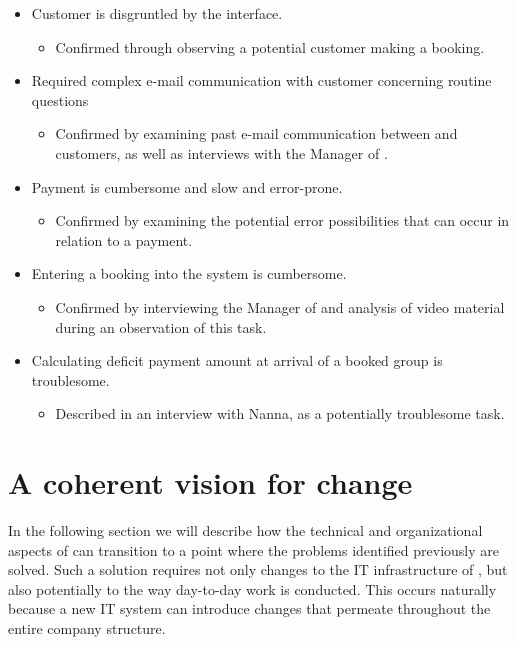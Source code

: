 \begin{itemize}
	\item Customer is disgruntled by the interface.
    \begin{itemize}
        \item Confirmed through observing a potential customer making a booking.
    \end{itemize}
	\item Required complex e-mail communication with customer concerning routine questions
        \begin{itemize}
            \item Confirmed by examining past e-mail communication between
                \gomonkey{} and customers, as well as interviews with the
                Manager of \gomonkey{}.
        \end{itemize}
	\item Payment is cumbersome and slow and error-prone.
        \begin{itemize}
            \item Confirmed by examining the potential error possibilities that
                can occur in relation to a payment.
        \end{itemize}
	\item Entering a booking into the system is cumbersome.
        \begin{itemize}
            \item Confirmed by interviewing the Manager of \gomonkey{} and
                analysis of video material during an observation of this task.
        \end{itemize}
	\item Calculating deficit payment amount at arrival of a booked group is
        troublesome.
        \begin{itemize}
            \item Described in an interview with Nanna, as a potentially
                troublesome task.
        \end{itemize}
\end{itemize}

\newpage
\section{A coherent vision for change}
In the following section we will describe how the technical and
organizational aspects of \gomonkey{} can transition to a point where the
problems identified previously are solved. Such a solution requires not only
changes to the IT infrastructure of \gomonkey{}, but also potentially to the way
day-to-day work is conducted. This occurs naturally because a new IT system
can introduce changes that permeate throughout the entire company structure.

